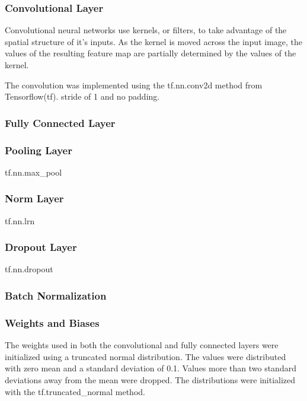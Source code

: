 \documentclass[]{article}
\begin{document}
\subsubsection{Convolutional Layer}

Convolutional neural networks use kernels, or filters, to take advantage of the spatial structure of it’s inputs. As the kernel is moved across the input image, the values of the resulting feature map are partially determined by the values of the kernel.

The convolution was implemented using the tf.nn.conv2d method from Tensorflow(tf). 
stride of 1 and no padding. 
\subsubsection{Fully Connected Layer}

\subsubsection{Pooling Layer}

tf.nn.max\_pool

\subsubsection{Norm Layer}

tf.nn.lrn

\subsubsection{Dropout Layer}

tf.nn.dropout

\subsubsection{Batch Normalization}

\subsubsection{Weights and Biases}

The weights used in both the convolutional and fully connected layers were initialized using a truncated normal distribution. The values were distributed with zero mean and a standard deviation of 0.1. Values more than two standard deviations away from the mean were dropped. The distributions were initialized with the tf.truncated\_normal method. 
\end{document}
